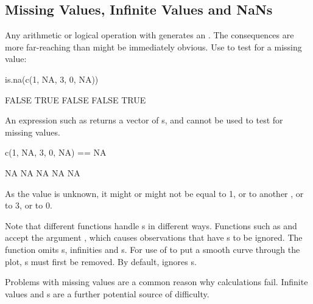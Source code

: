 \subsection{Missing Values, Infinite Values and NaNs}\label{ss:NA}

Any arithmetic or logical operation with  generates an
. The consequences are more far-reaching than might be
immediately obvious.  Use  to test for a missing value:
\begin{Schunk}
\begin{Sinput}
is.na(c(1, NA, 3, 0, NA))
\end{Sinput}
\begin{Soutput}
[1] FALSE  TRUE FALSE FALSE  TRUE
\end{Soutput}
\end{Schunk}

An expression such as  returns a vector of
s, and cannot be used to test for missing values.
\begin{Schunk}
\begin{Sinput}
c(1, NA, 3, 0, NA) == NA
\end{Sinput}
\begin{Soutput}
[1] NA NA NA NA NA
\end{Soutput}
\end{Schunk}
\noindent
As the value is unknown, it might or might not be equal to 1, or to another
, or to 3, or to 0.

Note that different functions handle s in  different ways.  Functions such as
 and  accept the argument
, which causes observations that have s to
be ignored.  The  function omits s, infinities
and s. For use of  to put a smooth curve
through the plot, s must first be removed.  By default,
 ignores s.

Problems with missing values are a common reason why calculations
fail. Infinite values and s are a further potential source
of difficulty.

